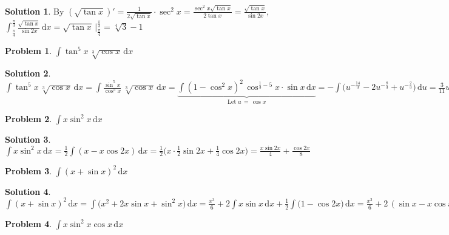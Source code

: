 \documentclass[11pt,a4paper]{article}
\newcommand{\ds}{\displaystyle}
\theoremstyle{definition}
\newtheorem*{problem}{Problem}
\newtheorem*{solution}{Solution}
\begin{document}
\begin{solution}
  By $\ds(\sqrt{\tan x})' = \frac{1}{2\sqrt{\tan x}}\cdot\sec^2\!x = \frac{\sec^2\!x\sqrt{\tan x}}{2\tan x} = \frac{\sqrt{\tan x}}{\sin 2x}$, $\ds\int_{\frac{\pi}{4}}^{\frac{\pi}{3}}\!\frac{\sqrt{\tan x}}{\sin 2x} \,\text{d}x = \sqrt{\tan x}\,\Big|_{\frac{\pi}{4}}^{\frac{\pi}{3}} = \sqrt[4]{3} - 1$
\end{solution}

\begin{problem}
  $\ds\int\!\tan^5\!x\,\sqrt[3]{\cos x}\,\text{d}x$
\end{problem}

\begin{solution}
  $\ds\int\!\tan^5\!x\,\sqrt[3]{\cos x}\,\text{d}x = \int\!\frac{\sin^5\!x}{\cos^5\!x}\,\sqrt[3]{\cos x}\,\text{d}x = \underbrace{\int\!(1 - \cos^2\!x)^2\,\cos^{\frac{1}{3} - 5}\!x\cdot\sin x\,\text{d}x}_{\text{Let}\;u\,=\,\cos x} = -\int\!\big(u^{-\frac{14}{3}} - 2u^{-\frac{8}{3}} + u^{-\frac{2}{3}}\big)\,\text{d}u = \frac{3}{11}u^{-\frac{11}{3}} - \frac{6}{5}u^{-\frac{5}{3}} - 3u^{\frac{1}{3}} = \frac{3}{11}\cos^{-\frac{11}{3}}\!x - \frac{6}{5}\cos^{-\frac{5}{3}}\!x - 3\cos^{\frac{1}{3}}\!x$
\end{solution}

\begin{problem}
  $\ds\int\!x \sin^2 x\,\text{d}x$
\end{problem}

\begin{solution}
  $\ds\int\!x \sin^2 x\,\text{d}x = \frac{1}{2}\int\!(x - x\cos 2x)\,\text{d}x = \frac{1}{2}\Big(x\cdot\frac{1}{2}\sin 2x + \frac{1}{4}\cos 2x\Big) = \frac{x\sin 2x}{4} + \frac{\cos 2x}{8}$
\end{solution}

\begin{problem}
  $\ds\int\!(x + \sin x)^2\,\text{d}x$
\end{problem}

\begin{solution}
  $\ds\int\!(x + \sin x)^2\,\text{d}x = \int\!\Big(x^2 + 2x\sin x + \sin^2 x\Big)\,\text{d}x = \frac{x^3}{6} + 2\int\!x\sin x\,\text{d}x + \frac{1}{2}\int\!\Big(1 - \cos 2x\Big)\,\text{d}x = \frac{x^3}{6} + 2\,(\sin x - x\cos x) + \frac{x}{2} - \frac{1}{4}\sin 2x$
\end{solution}

\begin{problem}
  $\ds\int\!x\sin^2 x\cos x\,\text{d}x$
\end{problem}
\end{document}
